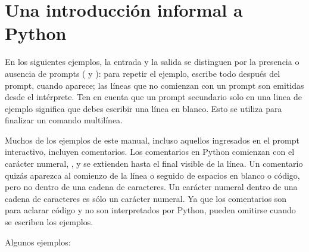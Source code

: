 \documentclass[a5paper,10pt,spanish]{sphinxmanual}
\begin{document}
\begin{sphinxVerbatim}[commandchars=\\\{\}]
\end{sphinxVerbatim}


\chapter{Una introducción informal a Python}
\label{\detokenize{tutorial/introduction:an-informal-introduction-to-python}}\label{\detokenize{tutorial/introduction:tut-informal}}\label{\detokenize{tutorial/introduction::doc}}
\sphinxAtStartPar
En los siguientes ejemplos, la entrada y la salida se distinguen por la presencia o ausencia de prompts ({\hyperref[\detokenize{glossary:term-0}]{}} y {\hyperref[\detokenize{glossary:term-...}]{}}): para repetir el ejemplo, escribe todo después del prompt, cuando aparece; las líneas que no comienzan con un prompt son emitidas desde el intérprete. Ten en cuenta que un prompt secundario solo en una linea de ejemplo significa que debes escribir una línea en blanco. Esto se utiliza para finalizar un comando multilínea.

\ignorespaces 
\sphinxAtStartPar
Muchos de los ejemplos de este manual, incluso aquellos ingresados en el prompt interactivo, incluyen comentarios. Los comentarios en Python comienzan con el carácter numeral, \sphinxcode{\sphinxupquote{\#}}, y se extienden hasta el final visible de la línea. Un comentario quizás aparezca al comienzo de la línea o seguido de espacios en blanco o código, pero no dentro de una cadena de caracteres. Un carácter numeral dentro de una cadena de caracteres es sólo un carácter numeral. Ya que los comentarios son para aclarar código y no son interpretados por Python, pueden omitirse cuando se escriben los ejemplos.

\sphinxAtStartPar
Algunos ejemplos:

\begin{sphinxVerbatim}[commandchars=\\\{\}]
    
  
\end{sphinxVerbatim}
\end{document}
